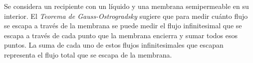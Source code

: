 \documentclass{report}
\begin{document}
    \noindent Se considera un recipiente con un líquido y una membrana semipermeable en su interior. El \textit{Teorema de Gauss-Ostrogradsky} sugiere que para medir cuánto flujo se escapa a través de la membrana
    se puede medir el flujo infinitesimal que se escapa a través de cada punto que la membrana encierra y sumar todos esos puntos. La suma de cada uno de estos flujos infinitesimales que escapan representa
    el flujo total que se escapa de la membrana.

\end{document}

